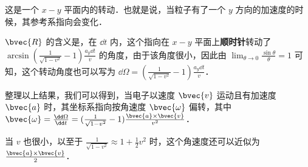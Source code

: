 这是一个 $x-y$ 平面内的转动．也就是说，当粒子有了一个 $y$ 方向的加速度的时候，其参考系指向会变化．

$\bvec{R}$ 的含义是，在 $\dd t$ 内，这个指向在 $x-y$ 平面上\textbf{顺时针}转动了 $\arcsin{(\frac{1}{\sqrt{1-v^2}}-1)\frac{a_y\dd t}{v}}$ 的角度，由于该角度很小，因此由 $\lim_{\theta\rightarrow 0}\frac{\sin\theta}{\theta}=1$ 可知，这个转动角度也可以写为 $\dd\Omega=(\frac{1}{\sqrt{1-v^2}}-1)\frac{a_y\dd t}{v}$．

整理以上结果，我们可以得到，当电子以速度 $\bvec{v}$ 运动且有加速度 $\bvec{a}$ 时，其坐标系指向按角速度 $\bvec{\omega}$ 偏转，其中 $\bvec{\omega}=\frac{\dd\Omega}{\dd t}=(\frac{1}{\sqrt{1-v^2}}-1)\frac{\bvec{a}\times\bvec{v}}{v^2}$．

当 $v$ 也很小，以至于 $\frac{1}{\sqrt{1-v^2}}\approx 1+\frac{1}{2}v^2$ 时，这个角速度还可以近似为 $\frac{\bvec{a}\times\bvec{v}}{2}$．








